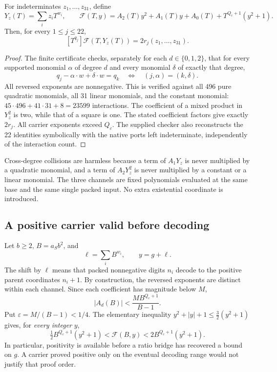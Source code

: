 \begin{lemma}
For indeterminates \(z_1,\ldots,z_{31}\), define
\[
 Y_z(T)=\sum_i z_iT^{w_i},\qquad
 \mathcal F(T,y)=A_2(T)y^2+A_1(T)y+A_0(T)+T^{Q_c+1}(y^2+1).
\]
Then, for every \(1\le j\le22\),
\[
 [T^{q_j}]\mathcal F(T,Y_z(T))=2r_j(z_1,\ldots,z_{31}).
\]
\end{lemma}
\begin{proof}
The finite certificate checks, separately for each \(d\in\{0,1,2\}\),
that for every supported monomial \(\alpha\) of degree \(d\) and every
monomial \(\delta\) of exactly that degree,
\[
 q_j-\alpha\cdot w+\delta\cdot w=q_k
 \quad\Longleftrightarrow\quad (j,\alpha)=(k,\delta).
\]
All reversed exponents are nonnegative.  This is verified against all
496 pure quadratic monomials, all 31 linear monomials, and the constant
monomial: \(45\cdot496+41\cdot31+8=23599\) interactions.  The
coefficient of a mixed product in \(Y_z^2\) is two, while that of a
square is one.  The stated coefficient factors give exactly \(2r_j\).
All carrier exponents exceed \(Q_c\).  The supplied checker also
reconstructs the 22 identities symbolically with the native ports left
indeterminate, independently of the interaction count.
\end{proof}

Cross-degree collisions are harmless because a term of \(A_1Y_z\)
is never multiplied by a quadratic monomial, and a term of \(A_2Y_z^2\)
is never multiplied by a constant or a linear monomial.  The three
channels are fixed polynomials evaluated at the same base and the same
single packed input.  No extra existential coordinate is introduced.

\subsection{A positive carrier valid before decoding}

Let \(b\ge2\), \(B=a_Sb^2\), and
\[
 \ell=\sum_iB^{w_i},\qquad y=g+\ell.
\]
The shift by \(\ell\) means that packed nonnegative digits \(n_i\)
decode to the positive parent coordinates \(n_i+1\).  By construction,
the reversed exponents are distinct within each channel.  Since each
coefficient has magnitude below \(M\),
\[
 |A_d(B)|<\frac{MB^{Q_c+1}}{B-1}.
\]
Put \(\varepsilon=M/(B-1)<1/4\).  The elementary inequality
\(y^2+|y|+1\le\tfrac32(y^2+1)\) gives, for \emph{every integer}
\(y\),
\begin{equation}
 \tfrac12B^{Q_c+1}(y^2+1)
 <\mathcal F(B,y)<2B^{Q_c+1}(y^2+1).
 \label{eq:carrier-positive}
\end{equation}
In particular, positivity is available before a ratio bridge has recovered
a bound on \(g\).  A carrier proved positive only on the eventual
decoding range would not justify that proof order.

